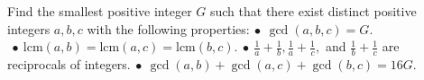 Find the smallest positive integer $G$ such that there exist distinct positive integers $a, b, c$ with the following properties:$\: \bullet \: \gcd(a, b, c) = G$.$\: \bullet \: \text{lcm}(a, b) = \text{lcm}(a, c) = \text{lcm}(b, c)$.$\: \bullet \: \frac{1}{a} + \frac{1}{b}, \frac{1}{a} + \frac{1}{c},$ and $\frac{1}{b} + \frac{1}{c}$ are reciprocals of integers.$\: \bullet \: \gcd(a, b) + \gcd(a, c) + \gcd(b, c) = 16G$.